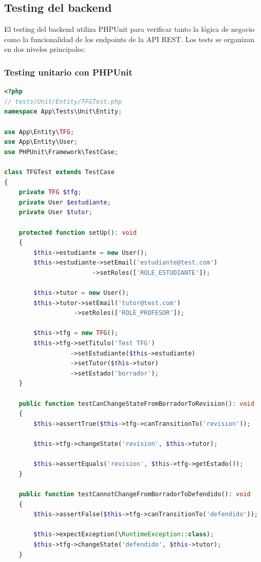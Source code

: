 \documentclass[12pt,a4paper,oneside]{report}
\begin{document}
\subsection{Testing del backend}\label{testing-del-backend}

El testing del backend utiliza PHPUnit para verificar tanto la lógica de negocio como la funcionalidad de los endpoints de la API REST. Los tests se organizan en dos niveles principales:

\subsubsection{Testing unitario con
PHPUnit}\label{testing-unitario-con-phpunit}

\begin{lstlisting}[language=PHP]
<?php
// tests/Unit/Entity/TFGTest.php
namespace App\Tests\Unit\Entity;

use App\Entity\TFG;
use App\Entity\User;
use PHPUnit\Framework\TestCase;

class TFGTest extends TestCase
{
    private TFG $tfg;
    private User $estudiante;
    private User $tutor;

    protected function setUp(): void
    {
        $this->estudiante = new User();
        $this->estudiante->setEmail('estudiante@test.com')
                        ->setRoles(['ROLE_ESTUDIANTE']);

        $this->tutor = new User();
        $this->tutor->setEmail('tutor@test.com')
                   ->setRoles(['ROLE_PROFESOR']);

        $this->tfg = new TFG();
        $this->tfg->setTitulo('Test TFG')
                  ->setEstudiante($this->estudiante)
                  ->setTutor($this->tutor)
                  ->setEstado('borrador');
    }

    public function testCanChangeStateFromBorradorToRevision(): void
    {
        $this->assertTrue($this->tfg->canTransitionTo('revision'));
        
        $this->tfg->changeState('revision', $this->tutor);
        
        $this->assertEquals('revision', $this->tfg->getEstado());
    }

    public function testCannotChangeFromBorradorToDefendido(): void
    {
        $this->assertFalse($this->tfg->canTransitionTo('defendido'));
        
        $this->expectException(\RuntimeException::class);
        $this->tfg->changeState('defendido', $this->tutor);
    }


\end{lstlisting}
\end{document}
